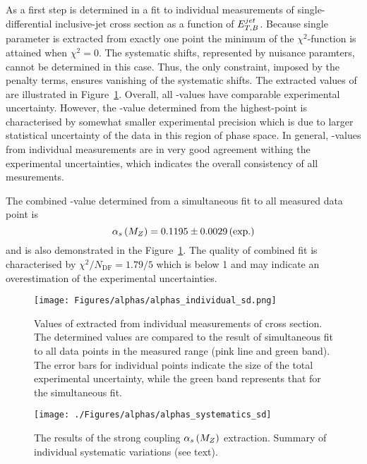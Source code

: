 As a first step \asz is determined in a fit to individual measurements of single-differential inclusive-jet cross section as a function of $\mbox{$E_{T,B}^{jet}$}$. Because single parameter is extracted from exactly one point the minimum of the $\chi^2$-function is attained when $\chi^2=0$. The systematic shifts, represented by nuisance paramters, cannot be determined in this case. Thus, the only constraint, imposed by the penalty terms, ensures vanishing of the systematic shifts. The extracted values of \asz are illustrated in Figure~\ref{fig:alphassinglediffindividual}. Overall, all \as-values have comparable experimental uncertainty. However, the \as-value determined from the highest-\etjetb point is characterised by somewhat smaller experimental precision which is due to larger statistical uncertainty of the data in this region of phase space. In general, \as-values from individual measurements are in very good agreement withing the experimental uncertainties, which indicates the overall consistency of all mesurements.

The combined \asz-value determined from a simultaneous fit to all measured data point is
\begin{equation}
 \asz = 0.1195 \pm 0.0029 \left( \text{exp.} \right) %
\end{equation}
and is also demonstrated in the Figure~\ref{fig:alphassinglediffindividual}. The quality of combined fit is characterised by $\chi^2/N_\text{DF}=1.79/5$ which is below 1 and may indicate an overestimation of the experimental uncertainties.

\begin{figure}[tp]
 \begin{center}
 \texttt{[image: Figures/alphas/alphas\_individual\_sd.png]}
\end{center}
 \caption{Values of \asz extracted from individual measurements of \dsdetjetb cross section. The determined values are compared to the result of simultaneous fit to all data points in the measured \etjetb range (pink line and green band). The error bars for individual points indicate the size of the total experimental uncertainty, while the green band represents that for the simultaneous fit.}
 \label{fig:alphassinglediffindividual}
\end{figure}


\begin{figure}[th!]
\centering
\texttt{[image: ./Figures/alphas/alphas\_systematics\_sd]}
\caption{The results of the strong coupling $\mbox{$\alpha_{s}\left(M_{Z}\right)$}$ extraction. Summary of individual systematic variations (see text).}
\label{fig:alphas_systematics}
\end{figure}


